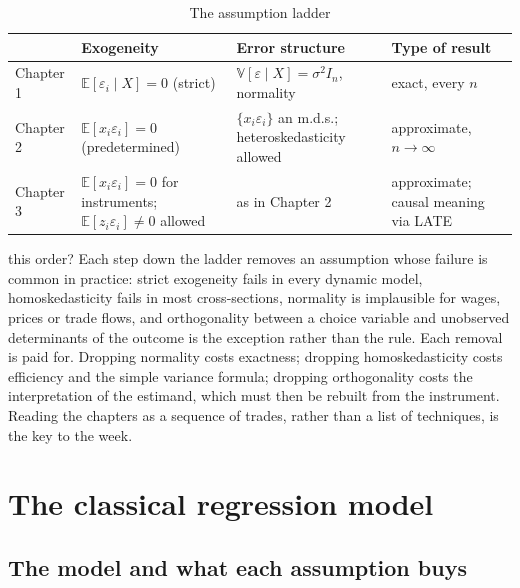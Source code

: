 \documentclass[11pt,a4paper]{article}
\newcommand{\E}{\mathbb{E}}
\newcommand{\V}{\mathbb{V}}
\begin{document}
\begin{table}[h]
\centering\small
\caption{The assumption ladder}\label{tab:ladder}
\begin{tabular}{@{}>{\raggedright\arraybackslash}p{2.1cm}>{\raggedright\arraybackslash}p{4.1cm}>{\raggedright\arraybackslash}p{3.7cm}>{\raggedright\arraybackslash}p{3.0cm}@{}}
\toprule
 & Exogeneity & Error structure & Type of result \\
\midrule
Chapter 1 & $\E[\varepsilon_i\mid X]=0$ (strict) & $\V[\varepsilon\mid X]=\sigma^2 I_n$, normality & exact, every $n$ \\
Chapter 2 & $\E[x_i\varepsilon_i]=0$ (predetermined) & $\{x_i\varepsilon_i\}$ an m.d.s.; heteroskedasticity allowed & approximate, $n\to\infty$ \\
Chapter 3 & $\E[x_i\varepsilon_i]=0$ for instruments; $\E[z_i\varepsilon_i]\neq 0$ allowed & as in Chapter 2 & approximate; causal meaning via LATE \\
\bottomrule
\end{tabular}
\end{table}

\begin{whybox}{this order?}
Each step down the ladder removes an assumption whose failure is common in practice: strict exogeneity fails in every dynamic model, homoskedasticity fails in most cross-sections, normality is implausible for wages, prices or trade flows, and orthogonality between a choice variable and unobserved determinants of the outcome is the exception rather than the rule. Each removal is paid for. Dropping normality costs exactness; dropping homoskedasticity costs efficiency and the simple variance formula; dropping orthogonality costs the interpretation of the estimand, which must then be rebuilt from the instrument. Reading the chapters as a sequence of trades, rather than a list of techniques, is the key to the week.
\end{whybox}

\section{The classical regression model}\label{sec:ch1}

\subsection{The model and what each assumption buys}
\end{document}

